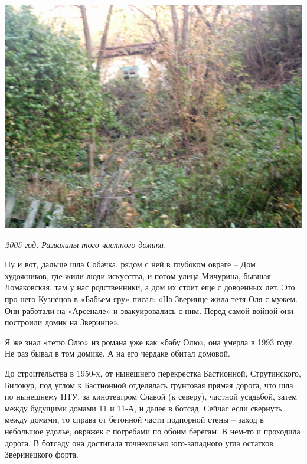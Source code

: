 \begin{center}
\includegraphics[width=0.99\linewidth]{chast-vosp/zver/imag0036.jpg}

\textit{2005 год. Развалины того частного домика.}
\end{center}

\newpage

Ну и вот, дальше шла Собачка, рядом с ней в глубоком овраге – Дом художников, где жили люди искусства, и потом улица Мичурина, бывшая Ломаковская, там у нас родственники, а дом их стоит еще с довоенных лет. Это про него Кузнецов в «Бабьем яру» писал: «На Зверинце жила тетя Оля с мужем. Они работали на «Арсенале» и эвакуировались с ним. Перед  самой  войной они построили  домик на Зверинце». 

Я же знал «тетю Олю» из романа уже как «бабу Олю», она умерла в 1993 году. Не раз бывал в том домике. А на его чердаке  обитал домовой.

До строительства в 1950-х, от нынешнего перекрестка Бастионной, Струтинского, Билокур, под углом к Бастионной отделялась грунтовая прямая дорога, что шла по нынешнему ПТУ, за кинотеатром Славой (к северу), частной усадьбой, затем между будущими домами 11 и 11-А, и далее в ботсад. Сейчас если свернуть между домами, то справа от бетонной части подпорной стены – заход в небольшое удолье, овражек с погребами по обоим берегам. В нем-то и проходила дорога. В ботсаду она достигала точнехонько юго-западного угла остатков Зверинецкого форта.


